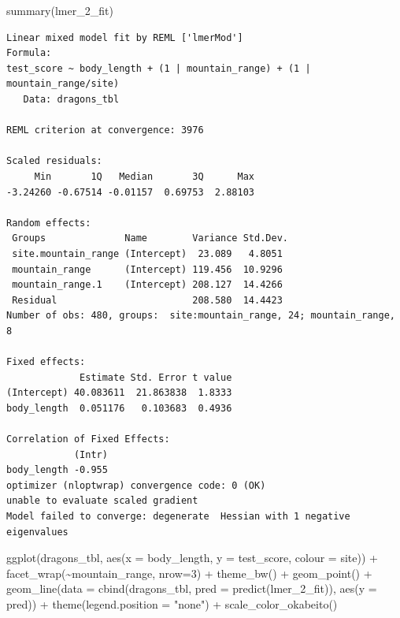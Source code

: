 \documentclass[
  letterpaper,
]{scrbook}
\newenvironment{Shaded}{\begin{snugshade}}{\end{snugshade}}
\newcommand{\AttributeTok}[1]{\textcolor[rgb]{0.40,0.45,0.13}{#1}}
\newcommand{\DecValTok}[1]{\textcolor[rgb]{0.68,0.00,0.00}{#1}}
\newcommand{\FunctionTok}[1]{\textcolor[rgb]{0.28,0.35,0.67}{#1}}
\newcommand{\NormalTok}[1]{\textcolor[rgb]{0.00,0.23,0.31}{#1}}
\newcommand{\SpecialCharTok}[1]{\textcolor[rgb]{0.37,0.37,0.37}{#1}}
\newcommand{\StringTok}[1]{\textcolor[rgb]{0.13,0.47,0.30}{#1}}
\begin{document}
\begin{Shaded}
\begin{Highlighting}[]
\FunctionTok{summary}\NormalTok{(lmer\_2\_fit)}
\end{Highlighting}
\end{Shaded}

\begin{verbatim}
Linear mixed model fit by REML ['lmerMod']
Formula: 
test_score ~ body_length + (1 | mountain_range) + (1 | mountain_range/site)
   Data: dragons_tbl

REML criterion at convergence: 3976

Scaled residuals: 
     Min       1Q   Median       3Q      Max 
-3.24260 -0.67514 -0.01157  0.69753  2.88103 

Random effects:
 Groups              Name        Variance Std.Dev.
 site.mountain_range (Intercept)  23.089   4.8051 
 mountain_range      (Intercept) 119.456  10.9296 
 mountain_range.1    (Intercept) 208.127  14.4266 
 Residual                        208.580  14.4423 
Number of obs: 480, groups:  site:mountain_range, 24; mountain_range, 8

Fixed effects:
             Estimate Std. Error t value
(Intercept) 40.083611  21.863838  1.8333
body_length  0.051176   0.103683  0.4936

Correlation of Fixed Effects:
            (Intr)
body_length -0.955
optimizer (nloptwrap) convergence code: 0 (OK)
unable to evaluate scaled gradient
Model failed to converge: degenerate  Hessian with 1 negative eigenvalues
\end{verbatim}

\begin{Shaded}
\begin{Highlighting}[]
\FunctionTok{ggplot}\NormalTok{(dragons\_tbl, }\FunctionTok{aes}\NormalTok{(}\AttributeTok{x =}\NormalTok{ body\_length, }\AttributeTok{y =}\NormalTok{ test\_score, }\AttributeTok{colour =}\NormalTok{ site)) }\SpecialCharTok{+}
  \FunctionTok{facet\_wrap}\NormalTok{(}\SpecialCharTok{\textasciitilde{}}\NormalTok{mountain\_range, }\AttributeTok{nrow=}\DecValTok{3}\NormalTok{) }\SpecialCharTok{+}
  \FunctionTok{theme\_bw}\NormalTok{() }\SpecialCharTok{+}
  \FunctionTok{geom\_point}\NormalTok{() }\SpecialCharTok{+}
  \FunctionTok{geom\_line}\NormalTok{(}\AttributeTok{data =} \FunctionTok{cbind}\NormalTok{(dragons\_tbl, }\AttributeTok{pred =} \FunctionTok{predict}\NormalTok{(lmer\_2\_fit)), }\FunctionTok{aes}\NormalTok{(}\AttributeTok{y =}\NormalTok{ pred)) }\SpecialCharTok{+}
  \FunctionTok{theme}\NormalTok{(}\AttributeTok{legend.position =} \StringTok{"none"}\NormalTok{) }\SpecialCharTok{+}
  \FunctionTok{scale\_color\_okabeito}\NormalTok{() }
\end{Highlighting}
\end{Shaded}
\end{document}
